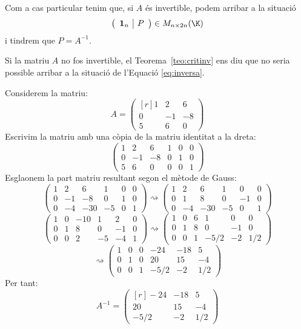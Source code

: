 Com a cas particular tenim que, si $A$ és invertible, podem arribar a la situació
\begin{equation}\label{eq:inversa}
\left(\begin{array}{c|c}\1_n & P \end{array}\right) \in M_{n\times 2n}(\K)
\end{equation}
i tindrem que $P=A^{-1}$.

Si la matriu $A$ no fos invertible, el Teorema~\ref{teo:critinv} ens diu que no seria possible arribar a la situació de l'Equació \eqref{eq:inversa}.
\begin{exemple}
	Considerem la matriu:
	$$
	A=\begin{pmatrix*}[r]
	1 & 2 & 6 \\ 0 & -1 & -8 \\ 5 & 6 & 0
	\end{pmatrix*}
	$$
	Escrivim la matriu amb una còpia de la matriu identitat a la dreta:
	$$
	\left(\begin{array}{rrr|rrr}
	1 & 2 & 6 & 1 & 0 & 0 \\
	0 & -1 & -8& 0 & 1 & 0 \\
	5 & 6 & 0 & 0 & 0 & 1
	\end{array}\right)
	$$
	Esglaonem la part matriu resultant segon el mètode de Gauss:
	$$
	\left(\begin{array}{rrr|rrr}
	1 & 2 & 6 & 1 & 0 & 0\\
	0 & -1 & -8 & 0 & 1 & 0\\
	0 & -4 & -30 & -5 & 0 & 1
	\end{array}\right)
	\rightsquigarrow
	\left(\begin{array}{rrr|rrr}
	1 & 2 & 6 & 1 & 0 & 0\\
	0 & 1 & 8 & 0 & -1 & 0\\
	0 & -4 & -30 & -5 & 0 & 1
	\end{array}\right)
	$$
	$$
	\left(\begin{array}{rrr|rrr}
	1 & 0 & -10  & 1 & 2 & 0\\
	0 &1 & 8 & 0 & -1 & 0\\
	0 & 0 & 2 & -5 & -4 & 1
	\end{array}\right)
	\rightsquigarrow
	\left(\begin{array}{rrr|rrr}
	1 & 0 & 6 & 1 & 0 & 0\\
	0 & 1 & 8 & 0 & -1 & 0\\
	0 & 0 & 1 & -5/2 & -2 & 1/2
	\end{array}\right)
	$$
	$$
	\rightsquigarrow\left(\begin{array}{rrr|rrr}
	1 & 0 & 0 & -24 & -18 & 5\\
	0 & 1 & 0 & 20 & 15 & -4\\
	0 & 0 & 1 & -5/2 & -2 & 1/2
	\end{array}\right)
	$$
	Per tant:
	$$
	A^{-1}=\begin{pmatrix*}[r]
	-24 & -18 & 5 \\
	20 & 15 & -4 \\
	-5/2 & -2 & 1/2
	\end{pmatrix*}
	$$
	
\end{exemple}
